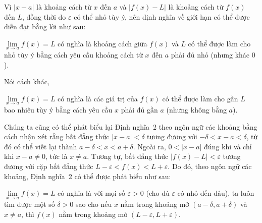 \begin{minipage}[t]{366pt}
    Vì $|x - a|$ là khoảng cách từ $x$ đến $a$ và $|f(x) - L|$ là khoảng cách từ $f(x)$ đến $L$, đồng thời do $\varepsilon$ có thể nhỏ tùy ý, nên định nghĩa về giới hạn có thể được diễn đạt bằng lời như sau:

    \begin{stewartdesc}
    $\lim\limits_{x \to a} f(x) = L$ có nghĩa là khoảng cách giữa $f(x)$ và $L$ có thể được làm cho nhỏ tùy ý bằng cách yêu cầu khoảng cách từ $x$ đến $a$ phải đủ nhỏ (nhưng khác $0$).
    \end{stewartdesc}

    Nói cách khác,

    \begin{stewartdesc}
    $\lim\limits_{x \to a} f(x) = L$ có nghĩa là các giá trị của $f(x)$ có thể được làm cho gần $L$ bao nhiêu tùy ý bằng cách yêu cầu $x$ phải đủ gần $a$ (nhưng không bằng $a$).
    \end{stewartdesc}

    Chúng ta cũng có thể phát biểu lại Định nghĩa~2 theo ngôn ngữ các khoảng bằng cách nhận xét rằng bất đẳng thức $|x - a| < \delta$ tương đương với $-\delta < x - a < \delta$, từ đó có thể viết lại thành $a - \delta < x < a + \delta$. Ngoài ra, $0 < |x - a|$ đúng khi và chỉ khi $x - a \neq 0$, tức là $x \neq a$. Tương tự, bất đẳng thức $|f(x) - L| < \varepsilon$ tương đương với cặp bất đẳng thức $L - \varepsilon < f(x) < L + \varepsilon$. Do đó, theo ngôn ngữ các khoảng, Định nghĩa~2 có thể được phát biểu như sau:

    \begin{stewartdesc}
    $\lim\limits_{x \to a} f(x) = L$ có nghĩa là với mọi số $\varepsilon > 0$ (cho dù $\varepsilon$ có nhỏ đến đâu), ta luôn tìm được một số $\delta > 0$ sao cho nếu $x$ nằm trong khoảng mở $(a - \delta, a + \delta)$ và $x \neq a$, thì $f(x)$ nằm trong khoảng mở $(L - \varepsilon, L + \varepsilon)$.
    \end{stewartdesc}
\end{minipage}
